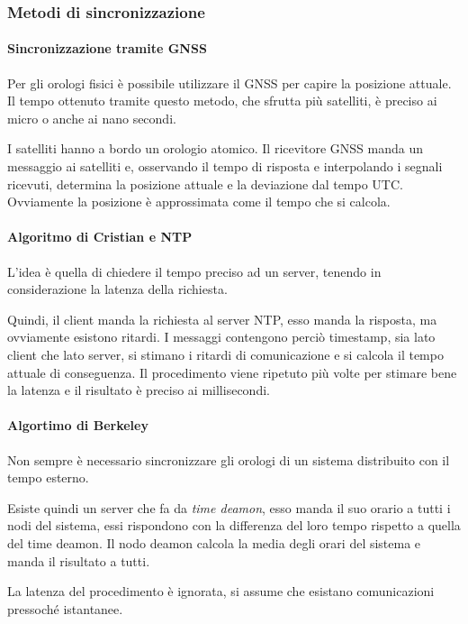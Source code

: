 \subsubsection{Metodi di sincronizzazione}

\paragraph{Sincronizzazione tramite GNSS}
Per gli orologi fisici è possibile utilizzare 
il GNSS per capire la posizione attuale. 
Il tempo ottenuto tramite questo metodo, 
che sfrutta più satelliti, 
è preciso ai micro o anche ai nano secondi. 

I satelliti hanno a bordo un orologio atomico.
Il ricevitore GNSS manda un messaggio ai satelliti e, 
osservando il tempo di risposta e interpolando 
i segnali ricevuti, determina la posizione attuale e 
la deviazione dal tempo UTC. Ovviamente la 
posizione è approssimata come il tempo che si calcola.

\paragraph{Algoritmo di Cristian e NTP}
L'idea è quella di chiedere il tempo preciso ad un server,
tenendo in considerazione la latenza della richiesta.

Quindi, il client manda la richiesta al server NTP, 
esso manda la risposta, ma ovviamente esistono ritardi.
I messaggi contengono perciò timestamp, sia lato client che 
lato server, si stimano i ritardi di comunicazione e si calcola
il tempo attuale di conseguenza. Il procedimento 
viene ripetuto più volte per stimare bene la latenza e il 
risultato è preciso ai millisecondi.

\paragraph{Algortimo di Berkeley}
Non sempre è necessario sincronizzare gli orologi 
di un sistema distribuito con il tempo esterno. 

Esiste quindi un server che fa da \emph{time deamon}, 
esso manda il suo orario a tutti i nodi 
del sistema, essi rispondono con la differenza 
del loro tempo rispetto a quella del time deamon. 
Il nodo deamon calcola la media degli orari del sistema 
e manda il risultato a tutti. 

La latenza del procedimento è ignorata, si assume che 
esistano comunicazioni pressoché istantanee.

